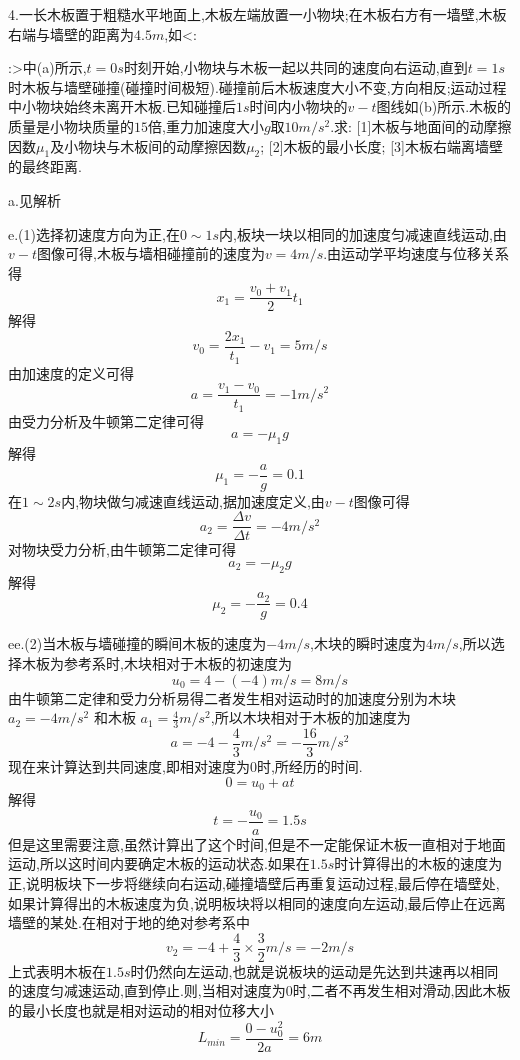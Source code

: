 \begin{calculate}
4.一长木板置于粗糙水平地面上,木板左端放置一小物块;在木板右方有一墙壁,木板右端与墙壁的距离为$4.5m$,如<:
:>中(a)所示,$t=0s$时刻开始,小物块与木板一起以共同的速度向右运动,直到$t=1s$时木板与墙壁碰撞(碰撞时间极短).碰撞前后木板速度大小不变,方向相反;运动过程中小物块始终未离开木板.已知碰撞后$1s$时间内小物块的$v-t$图线如(b)所示.木板的质量是小物块质量的$15$倍,重力加速度大小$g$取$10m/s^2$.求:
[1]木板与地面间的动摩擦因数$\mu_1$及小物块与木板间的动摩擦因数$\mu_2$;
[2]木板的最小长度;
[3]木板右端离墙壁的最终距离.

a.见解析

e.(1)选择初速度方向为正,在$0\sim 1s$内,板块一块以相同的加速度匀减速直线运动,由$v-t$图像可得,木板与墙相碰撞前的速度为$v=4m/s$.由运动学平均速度与位移关系得
\[
  x_1=\frac{v_0+v_1}{2}t_1
\]
解得
\[
  v_0=\frac{2x_1}{t_1}-v_1=5m/s
\]
由加速度的定义可得
\[
  a=\frac{v_1-v_0}{t_1}=-1m/s^2
\]
由受力分析及牛顿第二定律可得
\[
  a=-\mu_1 g
\]
解得
\[
  \mu_1 =-\frac{a}{g}=0.1
\]
在$1\sim 2s$内,物块做匀减速直线运动,据加速度定义,由$v-t$图像可得
\[
  a_2=\frac{\Delta v}{\Delta t}=-4m/s^2
\]
对物块受力分析,由牛顿第二定律可得
\[
  a_2=-\mu_2 g
\]
解得
\[
  \mu_2=-\frac{a_2}{g}=0.4
\]

ee.(2)当木板与墙碰撞的瞬间木板的速度为$-4m/s$,木块的瞬时速度为$4m/s$,所以选择木板为参考系时,木块相对于木板的初速度为
\[
u_0=4-(-4)m/s=8m/s
\]
由牛顿第二定律和受力分析易得二者发生相对运动时的加速度分别为木块$a_2=-4m/s^2$ 和木板 $a_1=\frac{4}{3}m/s^2$,所以木块相对于木板的加速度为
\[
  a=-4-\frac{4}{3}m/s^2=-\frac{16}{3}m/s^2
\]
现在来计算达到共同速度,即相对速度为$0$时,所经历的时间.
\[
0=u_0+at
\]
解得
\[
  t=-\frac{u_0}{a}=1.5s
\]
但是这里需要注意,虽然计算出了这个时间,但是不一定能保证木板一直相对于地面运动,所以这时间内要确定木板的运动状态.如果在$1.5s$时计算得出的木板的速度为正,说明板块下一步将继续向右运动,碰撞墙壁后再重复运动过程,最后停在墙壁处,如果计算得出的木板速度为负,说明板块将以相同的速度向左运动,最后停止在远离墙壁的某处.在相对于地的绝对参考系中
\[
  v_2=-4+\frac{4}{3}\times \frac{3}{2}m/s=-2m/s
\]
上式表明木板在$1.5s$时仍然向左运动,也就是说板块的运动是先达到共速再以相同的速度匀减速运动,直到停止.则,当相对速度为$0$时,二者不再发生相对滑动,因此木板的最小长度也就是相对运动的相对位移大小
\[
  L_{min}=\frac{0-u_0^2}{2a}=6m
\]


\end{calculate}
